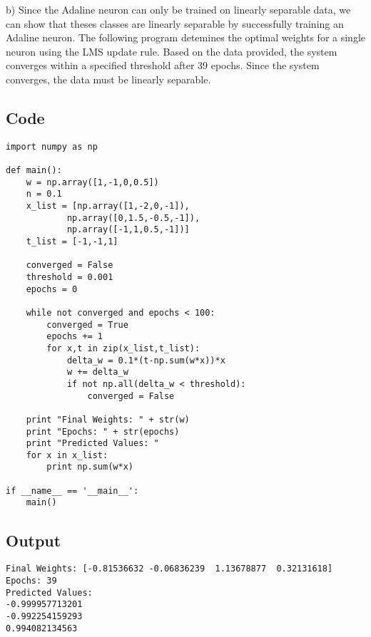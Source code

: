 \documentclass[a4paper,12pt]{article}
\begin{document}
b) Since the Adaline neuron can only be trained on linearly separable data, we can show that theses classes are linearly separable by successfully training an Adaline neuron. The following program detemines the optimal weights for a single neuron using the LMS update rule. Based on the data provided, the system converges within a specified threshold after 39 epochs. Since the system converges, the data must be linearly separable.

\subsection*{Code}
\begin{verbatim}
import numpy as np

def main():
    w = np.array([1,-1,0,0.5])
    n = 0.1
    x_list = [np.array([1,-2,0,-1]),
            np.array([0,1.5,-0.5,-1]),
            np.array([-1,1,0.5,-1])]
    t_list = [-1,-1,1]

    converged = False
    threshold = 0.001
    epochs = 0

    while not converged and epochs < 100:
        converged = True
        epochs += 1
        for x,t in zip(x_list,t_list):
            delta_w = 0.1*(t-np.sum(w*x))*x
            w += delta_w
            if not np.all(delta_w < threshold):
                converged = False

    print "Final Weights: " + str(w)
    print "Epochs: " + str(epochs)
    print "Predicted Values: "
    for x in x_list:
        print np.sum(w*x)

if __name__ == '__main__':
    main()
\end{verbatim}

\subsection*{Output}
\begin{verbatim}
Final Weights: [-0.81536632 -0.06836239  1.13678877  0.32131618]
Epochs: 39
Predicted Values: 
-0.999957713201
-0.992254159293
0.994082134563
\end{verbatim}
\end{document}
